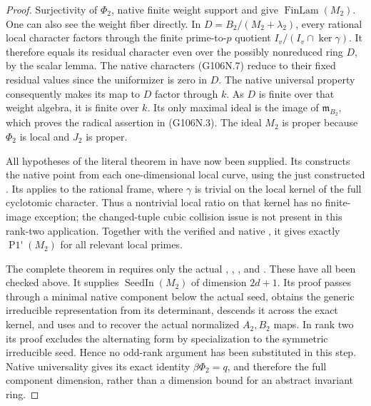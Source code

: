 \begin{proof}
Surjectivity of \(\Phi_2\), native finite weight
support and  give
\(\operatorname{FinLam}(M_2)\).
One can also see the weight fiber directly. In
\(D=B_2/(M_2+\lambda_2)\), every rational local
character factors through the finite prime-to-\(p\)
quotient \(I_v/(I_v\cap\ker\gamma)\).
It therefore equals its residual character even over
the possibly nonreduced ring \(D\), by the scalar
lemma. The native characters (G106N.7) reduce to
their fixed residual values since the uniformizer is
zero in \(D\). The native  universal
property consequently makes its map to \(D\) factor
through \(k\). As \(D\) is finite over that weight
algebra, it is finite over \(k\). Its only maximal
ideal is the image of \(\mathfrak m_{B_2}\), which
proves the radical assertion in (G106N.3).
The ideal \(M_2\) is proper because \(\Phi_2\) is
local and \(J_2\) is proper.

All hypotheses of the literal theorem 
in  have now
been supplied. Its  constructs the
native point from each one-dimensional local curve,
using the just constructed . Its
 applies to the rational frame, where
\(\gamma\) is trivial on the local kernel of the
full cyclotomic character. Thus a nontrivial local
ratio on that kernel has no finite-image exception;
the changed-tuple cubic collision issue is not
present in this rank-two application. Together
with the verified  and native
, it gives exactly
\(\operatorname{P1'}(M_2)\) for all relevant
local primes.

The complete theorem  in
 requires only the actual
, , ,
 and .
These have all been checked above. It supplies
\(\operatorname{SeedIn}(M_2)\) of dimension
\(2d+1\). Its proof passes through a minimal
native component below the actual seed, obtains
the generic irreducible representation from its
determinant, descends it across the exact
 kernel, and uses 
and  to recover the actual
normalized \(A_2,B_2\) maps. In rank two its
 proof excludes the alternating
form by specialization to the symmetric
irreducible seed. Hence no odd-rank argument
has been substituted in this step. Native
universality gives its exact identity
\(\beta\Phi_2=q\), and therefore the full
component dimension, rather than a dimension
bound for an abstract invariant ring.


\end{proof}
